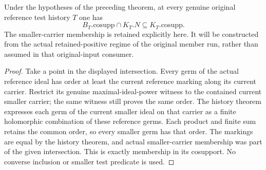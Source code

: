 \begin{theorem}
\label{hir:original-controlled-reference-current-cosupport}
\leanok
Under the hypotheses of the preceding theorem, at every genuine
original reference test history $T$ one has
\[
                    B_T.\mathrm{cosupp}\cap K_T.N
                    \subseteq K_T.\mathrm{cosupp}.
\]
The smaller-carrier membership is retained explicitly here. It will be
constructed from the actual retained-positive regime of the original
member run, rather than assumed in that original-input consumer.
\end{theorem}
\begin{proof}
Take a point in the displayed intersection. Every germ of the actual
reference ideal has order at least the current reference marking along
its current carrier. Restrict its genuine maximal-ideal-power witness
to the contained current smaller carrier; the same witness still proves
the same order. The history theorem expresses each germ of the current
smaller ideal on that carrier as a finite holomorphic combination of
these reference germs. Each product and finite sum retains the common
order, so every smaller germ has that order. The markings are equal by
the history theorem, and actual smaller-carrier membership was part of
the given intersection. This is exactly membership in its cosupport.
No converse inclusion or smaller test predicate is used.
\end{proof}

